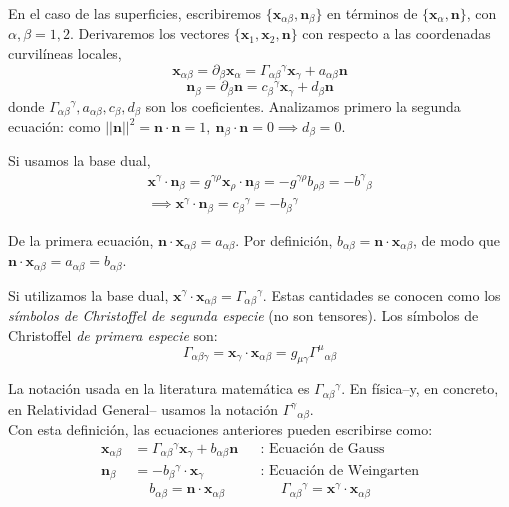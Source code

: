 En el caso de las superficies, escribiremos $\{ \mathbf{x}_{\alpha \beta },\mathbf{n}_\beta  \}$ en términos de $\{ \mathbf{x}_\alpha ,\mathbf{n} \}$, con $\alpha ,\beta =1,2$. Derivaremos los vectores $\{ \mathbf{x}_1,\mathbf{x}_2,\mathbf{n} \}$ con respecto a las coordenadas curvilíneas locales, 
$$
\mathbf{x}_{\alpha \beta }=\partial_\beta \mathbf{x}_\alpha =\Gamma_{\alpha \beta }{}^\gamma \mathbf{x}_\gamma +a_{\alpha \beta }\mathbf{n}
$$
$$
\mathbf{n}_\beta =\partial_\beta \mathbf{n}=c_\beta {}^\gamma \mathbf{x}_\gamma +d_\beta \mathbf{n}
$$
donde $\Gamma_{\alpha \beta}{}^\gamma ,a_{\alpha \beta} ,c_\beta ,d_\beta $ son los coeficientes. Analizamos primero la segunda ecuación: como $||\mathbf{n}||^2=\mathbf{n}\cdot \mathbf{n}=1,\ \mathbf{n}_\beta \cdot \mathbf{n}=0 \implies d_\beta =0$. 

Si usamos la base dual,
\begin{gather*}
    \mathbf{x}^\gamma \cdot \mathbf{n}_\beta =g^{\gamma \rho} \mathbf{x}_\rho \cdot \mathbf{n}_\beta=-g^{\gamma \rho} b_{\rho \beta }=-b^\gamma {}_\beta \\
    \implies \mathbf{x}^\gamma \cdot \mathbf{n}_\beta =c_\beta {}^\gamma =-b_\beta {}^\gamma 
\end{gather*}

De la primera ecuación, $\mathbf{n}\cdot \mathbf{x}_{\alpha \beta}=a_{\alpha \beta }$. Por definición, $b_{\alpha \beta }=\mathbf{n}\cdot \mathbf{x}_{\alpha \beta }$, de modo que $\mathbf{n}\cdot \mathbf{x}_{\alpha \beta }=a_{\alpha \beta }=b_{\alpha \beta }$. 

Si utilizamos la base dual, $\mathbf{x}^\gamma \cdot \mathbf{x}_{\alpha \beta }=\boxed{\Gamma _{\alpha \beta }{}^\gamma} $. Estas cantidades se conocen como los \emph{símbolos de Christoffel de segunda especie} (no son tensores). Los símbolos de Christoffel \emph{de primera especie} son:
$$
\Gamma _{\alpha \beta \gamma }=\mathbf{x}_\gamma \cdot \mathbf{x}_{\alpha \beta }=g_{\mu \gamma }\Gamma ^\mu{}_{\alpha \beta }
$$

La notación usada en la literatura matemática es $\Gamma _{\alpha \beta }{}^\gamma $. En física--y, en concreto, en Relatividad General-- usamos la notación $\Gamma ^\gamma {}_{\alpha \beta }$. \\

Con esta definición, las ecuaciones anteriores pueden escribirse como:
\begin{align}
    \mathbf{x}_{\alpha \beta }&=\Gamma _{\alpha \beta }{}^\gamma \mathbf{x}_\gamma +b_{\alpha \beta }\mathbf{n} &&\text{: Ecuación de Gauss} \tag*{[G]} \label{gauss}\\
    \mathbf{n}_\beta &=-b_\beta {}^\gamma \cdot \mathbf{x}_\gamma &&\text{: Ecuación de Weingarten} \tag*{[W]} \label{weingarten}
\end{align}
$$
b_{\alpha \beta }=\mathbf{n}\cdot \mathbf{x}_{\alpha \beta } \qquad \qquad \Gamma _{\alpha \beta }{}^\gamma =\mathbf{x}^\gamma \cdot \mathbf{x}_{\alpha \beta }
$$
